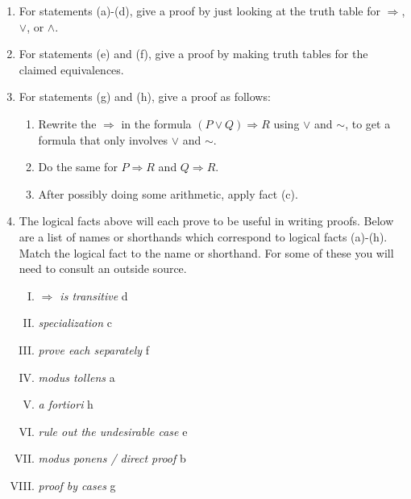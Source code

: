 \documentclass[11pt]{letter}  %
\begin{document}
			
\begin{enumerate}
	\item For statements (a)-(d), give a proof by just looking at the truth table for $\Rightarrow$, $\vee$, or $\wedge$.
		\vfill
	\item For statements (e) and (f), give a proof by making truth tables for the claimed equivalences.
	\vfill
	\newpage
	\item For statements (g) and (h), give a proof as follows:
		\begin{enumerate}
			\item Rewrite the $\Rightarrow$ in the formula $(P\vee Q)\Rightarrow R$ using $\vee$ and $\sim$, to get a formula that only involves $\vee$ and $\sim$.\vfill
			\item Do the same for $P\Rightarrow R$ and $Q\Rightarrow R$.\vfill
			\item After possibly doing some arithmetic, apply fact (c).
		\end{enumerate}
		\vfill
	\item The logical facts above will each prove to be useful in writing proofs. Below are a list of names or shorthands which correspond to logical facts (a)-(h). Match the logical fact to the name or shorthand. For some of these you will need to consult an outside source.
		\begin{enumerate}[(I)]
			\item {\em $\Rightarrow$ is transitive} d
			\item {\em specialization} c
			\item {\em prove each separately} f
			\item {\em modus tollens} a
			\item {\em a fortiori} h 
			\item {\em rule out the undesirable case} e
			\item {\em modus ponens / direct proof} b
			\item {\em proof by cases} g
		\end{enumerate}
\end{enumerate}
			
			
\end{document}
